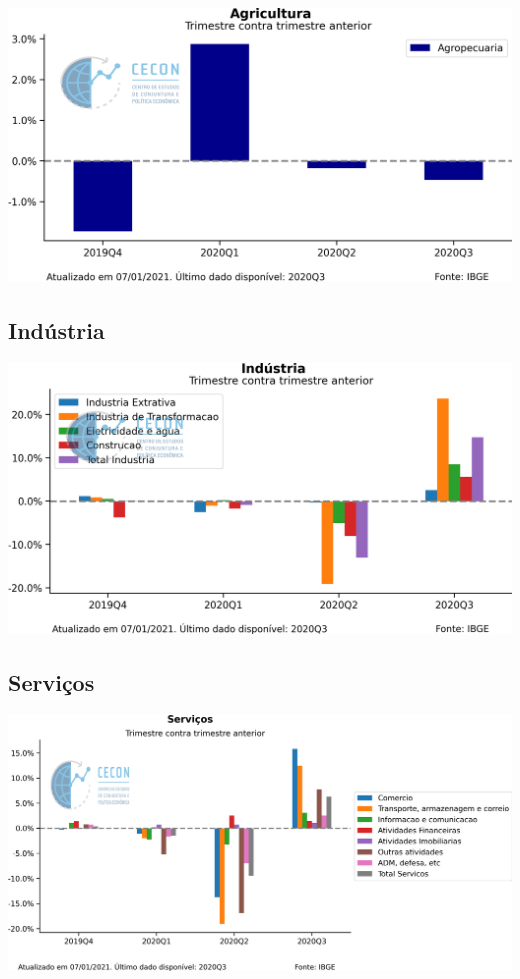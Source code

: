 \documentclass{SelfArx}
\begin{document}
\begin{center}
\includegraphics[width=.9\linewidth]{./figs/PIB/Agropecuaria.png}
\end{center}

\subsection*{Indústria}
\label{sec:org569a10b}

\begin{center}
\includegraphics[width=.9\linewidth]{./figs/PIB/Industria.png}
\end{center}


\subsection*{Serviços}
\label{sec:orga4e3b57}

\begin{center}
\includegraphics[width=.9\linewidth]{./figs/PIB/Servicos.png}
\end{center}
\end{document}
